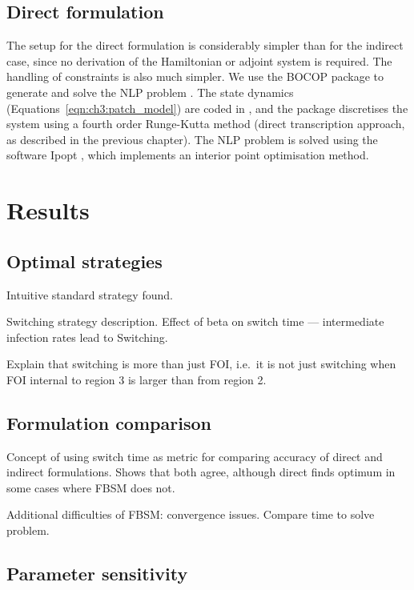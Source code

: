 \subsection{Direct formulation}

The setup for the direct formulation is considerably simpler than for the indirect case, since no derivation of the Hamiltonian or adjoint system is required. The handling of constraints is also much simpler. We use the BOCOP package to generate and solve the NLP problem \citep{bocop}. The state dynamics (Equations~\ref{eqn:ch3:patch_model}) are coded in \CC, and the package discretises the system using a fourth order Runge-Kutta method (direct transcription approach, as described in the previous chapter). The NLP problem is solved using the software Ipopt \citep{wachter_implementation_2006}, which implements an interior point optimisation method.

\section{Results}

\subsection{Optimal strategies}

Intuitive standard strategy found.

Switching strategy description. Effect of beta on switch time --- intermediate infection rates lead to Switching.

Explain that switching is more than just FOI, i.e.\ it is not just switching when FOI internal to region 3 is larger than from region 2.

\subsection{Formulation comparison}

Concept of using switch time as metric for comparing accuracy of direct and indirect formulations. Shows that both agree, although direct finds optimum in some cases where FBSM does not.

Additional difficulties of FBSM: convergence issues. Compare time to solve problem.

\subsection{Parameter sensitivity}

